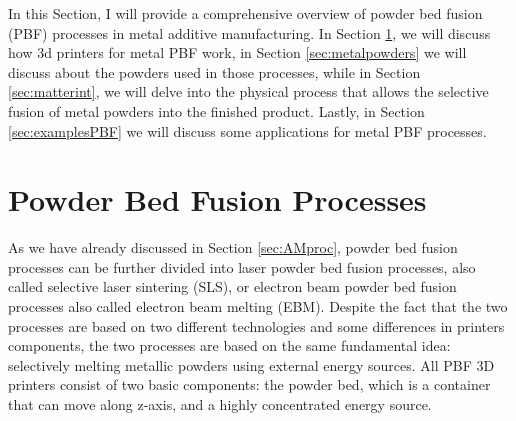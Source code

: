 \setlength{\tabcolsep}{10pt}
In this Section, I will provide a comprehensive overview of powder bed fusion (PBF) processes in metal additive manufacturing. In Section \ref{sec:pbf_proc}, we will discuss how 3d printers for metal PBF work, in Section \ref{sec:metalpowders} we will discuss about the powders used in those processes, while in Section \ref{sec:matterint}, we will delve into the physical process that allows the selective fusion of metal powders into the finished product. Lastly, in Section \ref{sec:examplesPBF} we will discuss some applications for metal PBF processes.

\section{Powder Bed Fusion Processes}\label{sec:pbf_proc}
As we have already discussed in Section \ref{sec:AMproc}, powder bed fusion processes can be further divided into laser powder bed fusion processes, also called selective laser sintering (SLS), or electron beam powder bed fusion processes also called electron beam melting (EBM). Despite the fact that the two processes are based on two different technologies and some differences in printers components, the two processes are based on the same fundamental idea: selectively melting metallic powders using external energy sources. All PBF 3D printers consist of two basic components: the powder bed, which is a container that can move along z-axis, and a highly concentrated energy source. 

